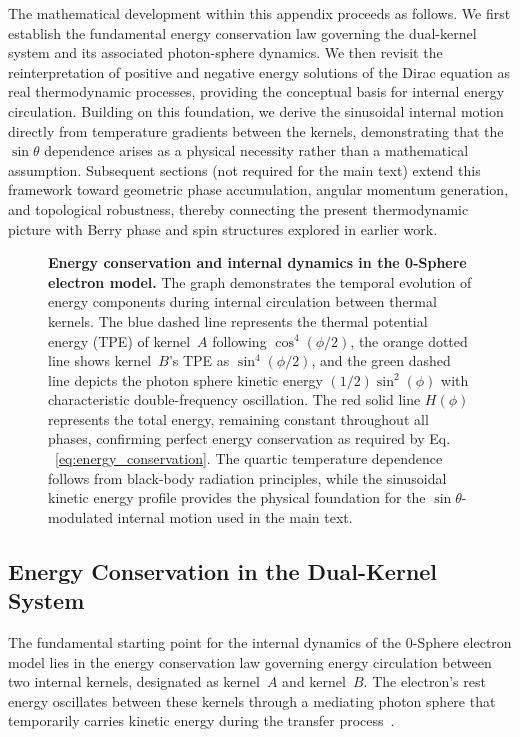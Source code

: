 \documentclass[%
 reprint,
 amsmath,amssymb,
 aps,
 prb,
]{revtex4-2}
\numberwithin{equation}{section}
\begin{document}
The mathematical development within this appendix proceeds as follows. We first establish the fundamental energy conservation law governing the dual-kernel system and its associated photon-sphere dynamics. We then revisit the reinterpretation of positive and negative energy solutions of the Dirac equation as real thermodynamic processes, providing the conceptual basis for internal energy circulation. Building on this foundation, we derive the sinusoidal internal motion directly from temperature gradients between the kernels, demonstrating that the $\sin\theta$ dependence arises as a physical necessity rather than a mathematical assumption. Subsequent sections (not required for the main text) extend this framework toward geometric phase accumulation, angular momentum generation, and topological robustness, thereby connecting the present thermodynamic picture with Berry phase and spin structures explored in earlier work.


\begin{figure}[t!] %
    \centering 
    \resizebox{\textwidth}{!}{%
    }
    \caption{\justifying \textbf{Energy conservation and internal dynamics in the 0-Sphere electron model.} The graph demonstrates the temporal evolution of energy components during internal circulation between thermal kernels. The blue dashed line represents the thermal potential energy (TPE) of kernel~$A$ following $\cos^4(\phi/2)$, the orange dotted line shows kernel~$B$'s TPE as $\sin^4(\phi/2)$, and the green dashed line depicts the photon sphere kinetic energy $(1/2)\sin^2(\phi)$ with characteristic double-frequency oscillation. The red solid line $H(\phi)$ represents the total energy, remaining constant throughout all phases, confirming perfect energy conservation as required by Eq. ~\eqref{eq:energy_conservation}. The quartic temperature dependence follows from black-body radiation principles, while the sinusoidal kinetic energy profile provides the physical foundation for the $\sin\theta$-modulated internal motion used in the main text.
    }
    \label{fig:energy_conservation}
\end{figure}

\subsection{Energy Conservation in the Dual-Kernel System}
\label{subsec:energy_conservation}

The fundamental starting point for the internal dynamics of the 0-Sphere electron model lies in the energy conservation law governing energy circulation between two internal kernels, designated as kernel~$A$ and kernel~$B$. The electron’s rest energy oscillates between these kernels through a mediating photon sphere that temporarily carries kinetic energy during the transfer process~\cite{hanamura16759284}.
\end{document}
